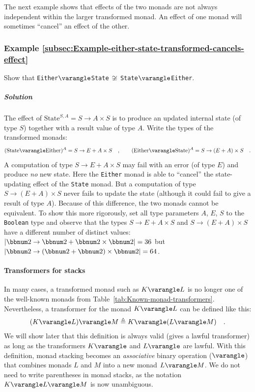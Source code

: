 The next example shows that effects of the two monads are not always
independent within the larger transformed monad. An effect of one
monad will sometimes \textsf{``}cancel\textsf{''} an effect of the other.

\subsubsection{Example \label{subsec:Example-either-state-transformed-cancels-effect}\ref{subsec:Example-either-state-transformed-cancels-effect}}

Show that \lstinline!Either!$\varangle$\lstinline!State!$\,\not\cong\,$\lstinline!State!$\varangle$\lstinline!Either!.

\subparagraph{Solution}

The effect of $\text{State}^{S,A}=S\rightarrow A\times S$ is to produce
an updated internal state (of type $S$) together with a result value
of type $A$. Write the types of the transformed monads:
\[
(\text{State}\varangle\text{Either})^{A}=S\rightarrow E+A\times S\quad,\quad\quad(\text{Either}\varangle\text{State})^{A}=S\rightarrow\left(E+A\right)\times S\quad.
\]
A computation of type $S\rightarrow E+A\times S$ may fail with an
error (of type $E$) and produce \emph{no} new state. Here the \lstinline!Either!
monad is able to \textsf{``}cancel\textsf{''} the state-updating effect of the \lstinline!State!
monad. But a computation of type $S\rightarrow(E+A)\times S$ never
fails to update the state (although it could fail to give a result
of type $A$). Because of this difference, the two monads cannot be
equivalent. To show this more rigorously, set all type parameters
$A$, $E$, $S$ to the \lstinline!Boolean! type and observe that
the types $S\rightarrow E+A\times S$ and $S\rightarrow\left(E+A\right)\times S$
have a different number of distinct values: $\left|\bbnum 2\rightarrow\bbnum 2+\bbnum 2\times\bbnum 2\right|=36$
but $\left|\bbnum 2\rightarrow\left(\bbnum 2+\bbnum 2\right)\times\bbnum 2\right|=64$.

\paragraph{Transformers for stacks}

In many cases, a transformed monad such as $K\varangle L$ is no longer
one of the well-known monads from Table~\ref{tab:Known-monad-transformers}.
Nevertheless, a transformer for the monad $K\varangle L$ can be defined
like this: 
\[
(K\varangle L)\varangle M\triangleq K\varangle(L\varangle M)\quad.
\]
We will show later that this definition is always valid (gives a lawful
transformer) as long as the transformers $K\varangle$ and $L\varangle$
are lawful. With this definition, monad stacking becomes an \emph{associative}
binary operation ($\varangle$) that combines monads $L$ and $M$
into a new monad $L\varangle M$. We do not need to write parentheses
in monad stacks, as the notation $K\varangle L\varangle M$ is now
unambiguous.

